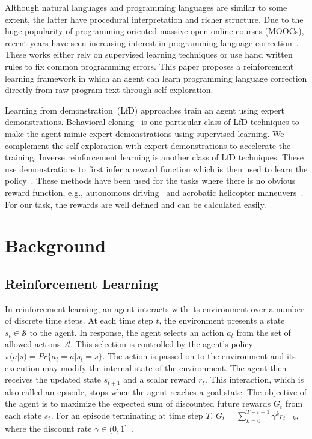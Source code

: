 \documentclass{article}
\begin{document}
Although natural languages and programming languages are similar to some extent,
the latter have procedural interpretation and richer structure.
Due to the huge popularity of programming oriented
massive open online courses (MOOCs),
recent years have seen increasing interest in programming language correction~\cite{gupta2017deepfix,parihar2017automatic}.
These works either rely on supervised learning techniques
or use hand written rules to fix common programming errors.
This paper proposes a reinforcement learning framework in which an agent
can learn programming language correction directly from raw program text through self-exploration.

Learning from demonstration~(LfD) approaches train an agent using expert demonstrations.
Behavioral cloning~\cite{DBLP:journals/jmlr/RossGB11} is one particular class of LfD techniques to make the agent mimic expert demonstrations using supervised learning.
We complement the self-exploration with expert demonstrations to accelerate the training.
Inverse reinforcement learning is another class of LfD techniques.
These use demonstrations to first infer a reward function which is then used to learn the policy~\cite{Abbeel:2004:ALV:1015330.1015430}.
These methods have been used for the tasks where there is no obvious reward function, e.g., autonomous driving~\cite{Abbeel:2004:ALV:1015330.1015430} and acrobatic helicopter maneuvers~\cite{abbeel2007application}.
For our task, the rewards are well defined and can be calculated easily.
 \section{Background}

\subsection{Reinforcement Learning}
In reinforcement learning, an agent interacts with its environment over a number of discrete time steps.
At each time step $ t $, the environment presents a state $ s_{t} \in \mathcal{S} $ to the agent. 
In response, the agent selects an action $ a_{t} $ from the set of allowed actions $ \mathcal{A} $.
This selection is controlled by the agent's policy $ \pi(a|s) = Pr\{a_t = a | s_t = s\} $.
The action is passed on to the environment and its execution 
may modify the internal state of the environment. 
The agent then receives the updated state $ s_{t+1} $ and a scalar reward  $ r_{t} $. 
This interaction, which is also called an episode,  stops when the agent reaches a goal state.
The objective of the agent is to maximize the expected sum of discounted future rewards $ G_{t} $ from each state $ s_t $.
For an episode terminating at time step $ T $, $ G_{t} = \sum_{k=0}^{T-t-1}\gamma^{k} r_{t+k} $, where the discount rate $ \gamma \in (0, 1] $~\cite{sutton1998reinforcement}.
\end{document}
